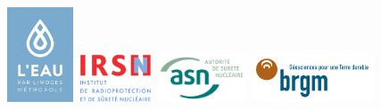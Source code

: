 \documentclass{article}
\begin{document}
\begin{center}
\vspace{0.2 em}
\includegraphics[height = 80pt ]{logoeaulimoges.png}
\hspace{0.3em}
\includegraphics[height = 40pt ]{logoIRSN.png} 
\hspace{0.3em}
\includegraphics[height = 40pt]{logo_ASN.png}
\hspace{0.3em}
\includegraphics[height = 40pt]{logo_BRGM.png}

\end{center}

\newpage
{}
\tableofcontents

\newpage
\end{document}
